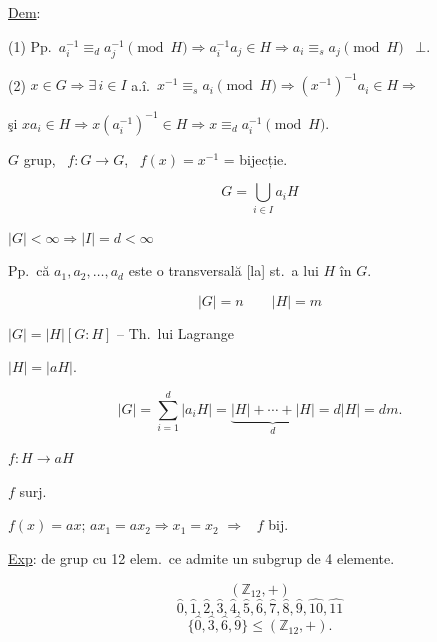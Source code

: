 \documentclass[12pt]{article}
\begin{document}
\noindent\underline{Dem}:

\bigskip
\noindent (1) Pp.\ $a_i^{-1}\equiv_d a_j^{-1} \pmod H \Rightarrow a_i^{-1}a_j\in H \Rightarrow a_i\equiv_s a_j \pmod H$ \ $\bot$.

\bigskip
\noindent (2) $x\in G \Rightarrow \exists\, i\in I$ a.î.\ $x^{-1}\equiv_s a_i \pmod H \Rightarrow (x^{-1})^{-1}a_i\in H \Rightarrow$

\noindent şi $xa_i\in H \Rightarrow x(a_i^{-1})^{-1}\in H \Rightarrow x\equiv_d a_i^{-1} \pmod H$.

\bigskip
\noindent $G$ grup, \ $f:G\to G$, \ $f(x)=x^{-1}$ = bijecție.

\bigskip
\noindent
\[
G = \bigcup_{i\in I} a_iH
\]

\noindent $|G|<\infty \Rightarrow |I|=d<\infty$

\medskip
\noindent Pp.\ că $a_1,a_2,\ldots,a_d$ este o transversală [la] st.\ a lui $H$ în $G$.

\[
|G|=n \qquad |H|=m
\]

\noindent $|G| = |H|[G:H]$ -- Th.\ lui Lagrange

\noindent $|H|=|aH|$.

\[
|G| = \sum_{i=1}^{d} |a_iH| = \underbrace{|H|+\cdots+|H|}_{d} = d|H| = dm.
\]

\noindent $f : H \to aH$

\noindent $f$ surj.

\noindent $f(x)=ax$; \quad $ax_1=ax_2 \Rightarrow x_1=x_2$ \quad $\Rightarrow$ \ $f$ bij.

\bigskip
\noindent\underline{Exp}: de grup cu 12 elem.\ ce admite un subgrup de 4 elemente.

\[
(\mathbb{Z}_{12},+)
\]
\[
\hat 0,\hat 1,\hat 2,\hat 3,\hat 4,\hat 5,\hat 6,\hat 7,\hat 8,\hat 9,\hat{10},\hat{11}
\]
\[
\{\hat 0,\hat 3,\hat 6,\hat 9\} \leq (\mathbb{Z}_{12},+).
\]
\end{document}
